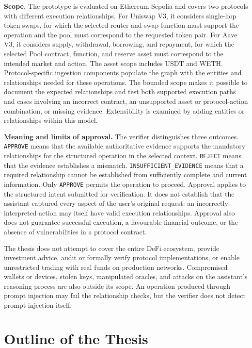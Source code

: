 \medskip
\noindent\textbf{Scope.}
The prototype is evaluated on Ethereum Sepolia and covers two protocols
with different execution relationships. For Uniswap V3, it considers
single-hop token swaps, for which the selected router and swap function
must support the operation and the pool must correspond to the
requested token pair. For Aave V3, it considers supply, withdrawal,
borrowing, and repayment, for which the selected Pool contract,
function, and reserve asset must correspond to the intended market
and action. The asset scope includes USDT and WETH. Protocol-specific ingestion components populate the graph with the
entities and relationships needed for these operations. The bounded
scope makes it possible to document the expected relationships and
test both supported execution paths and cases involving an incorrect
contract, an unsupported asset or protocol-action combination, or
missing evidence. Extensibility is examined by adding entities or
relationships within this model.

\medskip
\noindent\textbf{Meaning and limits of approval.}
The verifier distinguishes three outcomes. \texttt{APPROVE} means
that the available authoritative evidence supports the mandatory
relationships for the structured operation in the selected context.
\texttt{REJECT} means that the evidence establishes a mismatch.
\texttt{INSUFFICIENT\_EVIDENCE} means that a required relationship
cannot be established from sufficiently complete and current
information. Only \texttt{APPROVE} permits the operation to proceed. Approval applies to the structured intent submitted for verification.
It does not establish that the assistant captured every aspect of the
user's original request: an incorrectly interpreted action may itself
have valid execution relationships. Approval also does not guarantee
successful execution, a favourable financial outcome, or the absence
of vulnerabilities in a protocol contract.

The thesis does not attempt to cover the entire DeFi ecosystem,
provide investment advice, audit or formally verify protocol
implementations, or enable unrestricted trading with real funds on
production networks. Compromised wallets or devices, stolen keys,
manipulated oracles, and attacks on the assistant's reasoning process
are also outside its scope. An operation produced through prompt
injection may fail the relationship checks, but the verifier does not
detect prompt injection itself.


\section{Outline of the Thesis}
\label{sec:thesis_structure}

